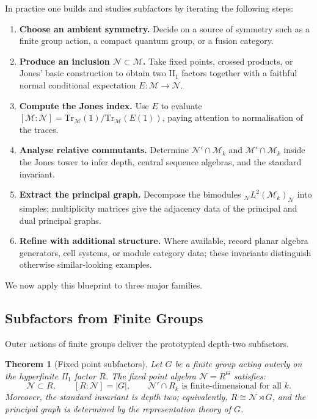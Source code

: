 \documentclass[11pt, a4paper]{article}
\theoremstyle{colored_def}
\theoremstyle{colored_thm}
\newtheorem{theorem}{Theorem}[section]
\theoremstyle{colored_ex}
\newcommand{\Tr}{\text{Tr}}
\newcommand{\M}{\mathcal{M}}
\newcommand{\N}{\mathcal{N}}
\begin{document}
In practice one builds and studies subfactors by iterating the following steps:
\begin{enumerate}
    \item \textbf{Choose an ambient symmetry.} Decide on a source of symmetry such as a finite group action, a compact quantum group, or a fusion category.
    \item \textbf{Produce an inclusion $\N \subset \M$.} Take fixed points, crossed products, or Jones' basic construction to obtain two II$_1$ factors together with a faithful normal conditional expectation $E \colon \M \to \N$.
    \item \textbf{Compute the Jones index.} Use $E$ to evaluate $[ \M : \N ] = \Tr_\M(1) / \Tr_\M(E(1))$, paying attention to normalisation of the traces.
    \item \textbf{Analyse relative commutants.} Determine $\N' \cap \M_k$ and $\M' \cap \M_k$ inside the Jones tower to infer depth, central sequence algebras, and the standard invariant.
    \item \textbf{Extract the principal graph.} Decompose the bimodules ${}_{\N}L^2(\M_k)_{\N}$ into simples; multiplicity matrices give the adjacency data of the principal and dual principal graphs.
    \item \textbf{Refine with additional structure.} Where available, record planar algebra generators, cell systems, or module category data; these invariants distinguish otherwise similar-looking examples.
\end{enumerate}
We now apply this blueprint to three major families.

\subsection{Subfactors from Finite Groups}\label{subsec:group-subfactors}

Outer actions of finite groups deliver the prototypical depth-two subfactors.

\begin{theorem}[Fixed point subfactors]\label{thm:fixed-point}
Let $G$ be a finite group acting outerly on the hyperfinite II$_1$ factor $R$. The fixed point algebra $\N = R^G$ satisfies:
\begin{equation*}
    \N \subset R, \qquad [R : \N] = |G|, \qquad \N' \cap R_k \text{ is finite-dimensional for all } k.
\end{equation*}
Moreover, the standard invariant is depth two; equivalently, $R \cong \N \rtimes G$, and the principal graph is determined by the representation theory of $G$.
\end{theorem}
\end{document}
